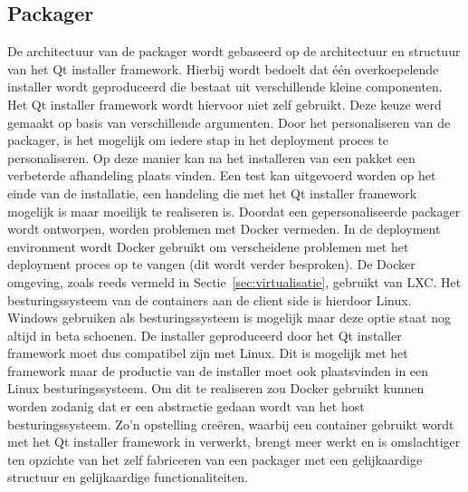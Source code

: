 \subsection{Packager}
De architectuur van de packager wordt gebaseerd op de architectuur en structuur van het Qt installer framework.
Hierbij wordt bedoelt dat één overkoepelende installer wordt geproduceerd die bestaat uit verschillende kleine componenten.
Het Qt installer framework wordt hiervoor niet zelf gebruikt.
Deze keuze werd gemaakt op basis van verschillende argumenten.
Door het personaliseren van de packager, is het mogelijk om iedere stap in het deployment proces te personaliseren.
Op deze manier kan na het installeren van een pakket een verbeterde afhandeling plaats vinden.
Een test kan uitgevoerd worden op het einde van de installatie, een handeling die met het Qt installer framework mogelijk is maar moeilijk te realiseren is.
Doordat een gepersonaliseerde packager wordt ontworpen, worden problemen met Docker vermeden.
In de deployment environment wordt Docker gebruikt om verscheidene problemen met het deployment proces op te vangen (dit wordt verder besproken).
De Docker omgeving, zoals reeds vermeld in Sectie~\vref{sec:virtualisatie}, gebruikt van LXC.
Het besturingssysteem van de containers aan de client side is hierdoor Linux.
Windows gebruiken als besturingssysteem is mogelijk maar deze optie staat nog altijd in beta schoenen.
De installer geproduceerd door het Qt installer framework moet dus compatibel zijn met Linux.
Dit is mogelijk met het framework maar de productie van de installer moet ook plaatsvinden in een Linux besturingssysteem.
Om dit te realiseren zou Docker gebruikt kunnen worden zodanig dat er een abstractie gedaan wordt van het host besturingssysteem.
Zo'n opstelling creëren, waarbij een container gebruikt wordt met het Qt installer framework in verwerkt, brengt meer werkt en is omslachtiger ten opzichte van het zelf fabriceren van een packager met een gelijkaardige structuur en gelijkaardige functionaliteiten.


